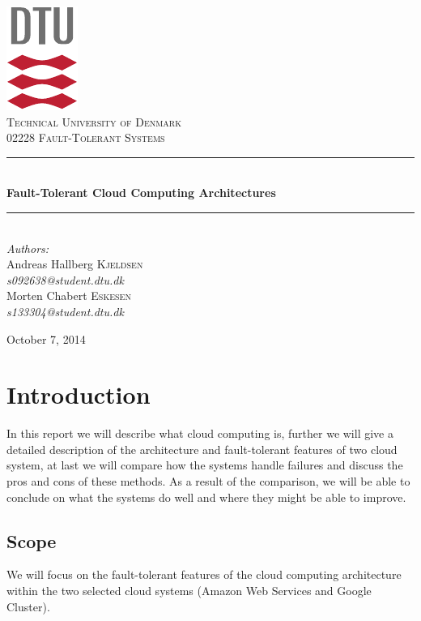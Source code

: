 \documentclass[11pt]{report}
\newcommand{\HRule}{\rule{\linewidth}{0.5mm}}
\begin{document}
\begin{titlepage}
\begin{center}

\includegraphics[scale=2.0]{../GFX/dtu_logo.pdf}\\[1cm]
\textsc{\LARGE Technical University of Denmark}\\[1.5cm]
\textsc{\Large 02228 Fault-Tolerant Systems}\\[0.5cm]

\HRule \\[0.4cm]
{\huge \bfseries Fault-Tolerant Cloud Computing Architectures}\\[0.1cm]
\HRule \\[1.5cm]

{\large
\emph{Authors:} \\[10pt]
Andreas Hallberg \textsc{Kjeldsen}\\
\emph{s092638@student.dtu.dk} \\[10pt]
Morten Chabert \textsc{Eskesen}\\
\emph{s133304@student.dtu.dk}
}
\vfill

{\large October 7, 2014}

\end{center}
\end{titlepage}

\chapter{Introduction}
In this report we will describe what cloud computing is, further we will give a detailed description of the architecture and fault-tolerant features of two cloud system, at last we will compare how the systems handle failures and discuss the pros and cons of these methods. As a result of the comparison, we will be able to conclude on what the systems do well and where they might be able to improve.

\section{Scope}
We will focus on the fault-tolerant features of the cloud computing architecture within the two selected cloud systems (Amazon Web Services and Google Cluster).
\end{document}
